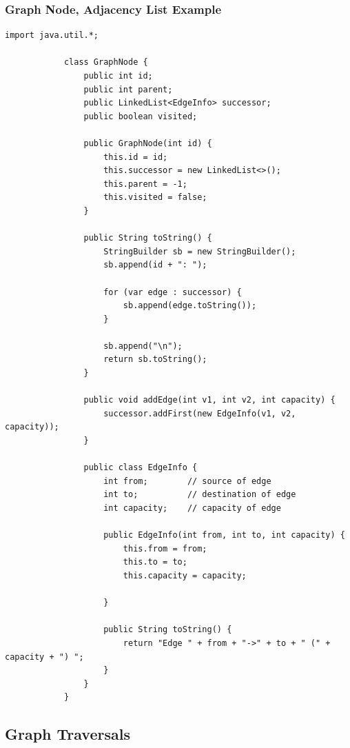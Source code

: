 \documentclass[10pt]{article}
\begin{document}
\subsubsection{Graph Node, Adjacency List Example }
\begin{lstlisting}[style=java]
            import java.util.*;

            class GraphNode {
                public int id;
                public int parent;
                public LinkedList<EdgeInfo> successor;
                public boolean visited;

                public GraphNode(int id) {
                    this.id = id;
                    this.successor = new LinkedList<>();
                    this.parent = -1;
                    this.visited = false;
                }

                public String toString() {
                    StringBuilder sb = new StringBuilder();
                    sb.append(id + ": ");

                    for (var edge : successor) {
                        sb.append(edge.toString());
                    }

                    sb.append("\n");
                    return sb.toString();
                }

                public void addEdge(int v1, int v2, int capacity) {
                    successor.addFirst(new EdgeInfo(v1, v2, capacity));
                }

                public class EdgeInfo {
                    int from;        // source of edge
                    int to;          // destination of edge
                    int capacity;    // capacity of edge

                    public EdgeInfo(int from, int to, int capacity) {
                        this.from = from;
                        this.to = to;
                        this.capacity = capacity;

                    }

                    public String toString() {
                        return "Edge " + from + "->" + to + " (" + capacity + ") ";
                    }
                }
            }

        \end{lstlisting}

\subsection{Graph Traversals}
\end{document}
